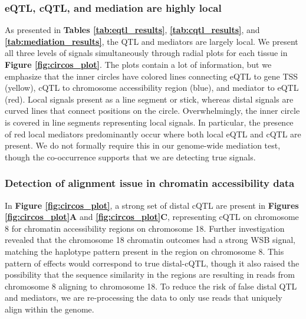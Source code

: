 \subsubsection{eQTL, cQTL, and mediation are highly local}

As presented in \textbf{Tables \ref{tab:eqtl_results}}, \textbf{\ref{tab:cqtl_results}}, and \textbf{\ref{tab:mediation_results}}, the QTL and mediators are largely local. We present all three levels of signals simultaneously through radial plots for each tissue in \textbf{Figure \ref{fig:circos_plot}}. The plots contain a lot of information, but we emphasize that the inner circles have colored lines connecting eQTL to gene TSS (yellow), cQTL to chromosome accessibility region (blue), and mediator to eQTL (red). Local signals present as a line segment or stick, whereas distal signals are curved lines that connect positions on the circle. Overwhelmingly, the inner circle is covered in line segments representing local signals. In particular, the presence of red local mediators predominantly occur where both local eQTL and cQTL are present. We do not formally require this in our genome-wide mediation test, though the co-occurrence supports that we are detecting true signals.

\subsubsection{Detection of alignment issue in chromatin accessibility data}

In \textbf{Figure \ref{fig:circos_plot}}, a strong set of distal cQTL are present in \textbf{Figures \ref{fig:circos_plot}A} and \textbf{\ref{fig:circos_plot}C}, representing cQTL on chromosome 8 for chromatin accessibility regions on chromosome 18. Further investigation revealed that the chromosome 18 chromatin outcomes had a strong WSB signal, matching the haplotype pattern present in the region on chromosome 8. This pattern of effects would correspond to true distal-cQTL, though it also raised the possibility that the sequence similarity in the regions are resulting in reads from chromosome 8 aligning to chromosome 18. To reduce the risk of false distal QTL and mediators, we are re-processing the data to only use reads that uniquely align within the genome.


